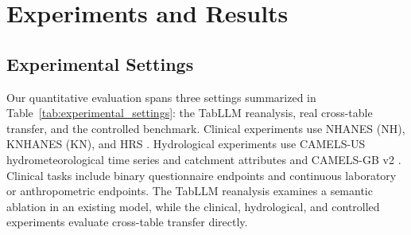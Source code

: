 \documentclass{article} %
\begin{document}
\section{Experiments and Results}
\label{sec:experiments}

\subsection{Experimental Settings}
\label{sec:exp_setup}

Our quantitative evaluation spans three settings summarized in Table~\ref{tab:experimental_settings}: the TabLLM reanalysis, real cross-table transfer, and the controlled benchmark.
Clinical experiments use NHANES (NH), KNHANES (KN), and HRS
\citep{johnson2013nhanes,kweon2014knhanes,sonnega2014hrs}.
Hydrological experiments use CAMELS-US hydrometeorological time series and
catchment attributes \citep{newman2014camelsdata,addor2017camelsattributes}
and CAMELS-GB v2 \citep{coxon2025camelsgbv2}.
Clinical tasks include binary questionnaire endpoints and continuous laboratory or anthropometric endpoints.
The TabLLM reanalysis examines a semantic ablation in an existing model, while the clinical, hydrological, and controlled experiments evaluate cross-table transfer directly.
\end{document}
